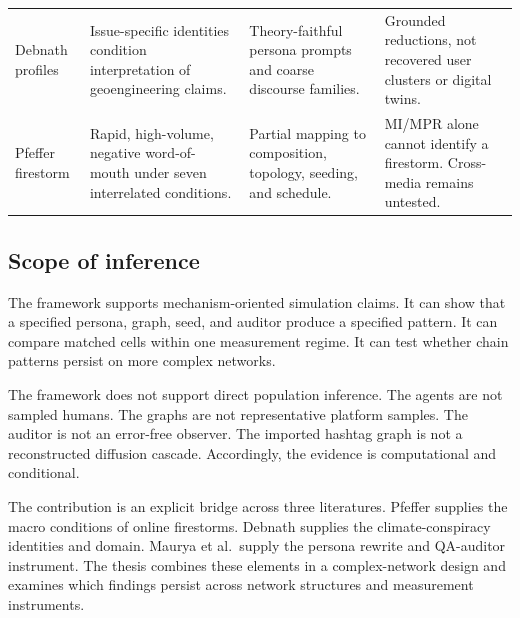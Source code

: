 \begin{table}[tbp]
\begin{tabular}{p{}p{}p{}p{}}
Debnath profiles
& Issue-specific identities condition interpretation of geoengineering claims.
& Theory-faithful persona prompts and coarse discourse families.
& Grounded reductions, not recovered user clusters or digital twins. \\

Pfeffer firestorm
& Rapid, high-volume, negative word-of-mouth under seven interrelated conditions.
& Partial mapping to composition, topology, seeding, and schedule.
& MI/MPR alone cannot identify a firestorm. Cross-media remains untested. \\
\bottomrule
\end{tabular}
\end{table}

\subsection{Scope of inference}
\label{subsec:scope-inference}

The framework supports mechanism-oriented simulation claims.
It can show that a specified persona, graph, seed, and auditor produce a specified pattern.
It can compare matched cells within one measurement regime.
It can test whether chain patterns persist on more complex networks.

The framework does not support direct population inference.
The agents are not sampled humans.
The graphs are not representative platform samples.
The auditor is not an error-free observer.
The imported hashtag graph is not a reconstructed diffusion cascade.
Accordingly, the evidence is computational and conditional.

The contribution is an explicit bridge across three literatures.
Pfeffer supplies the macro conditions of online firestorms.
Debnath supplies the climate-conspiracy identities and domain.
Maurya et al.\ supply the persona rewrite and QA-auditor instrument.
The thesis combines these elements in a complex-network design and examines which findings persist across network structures and measurement instruments.
